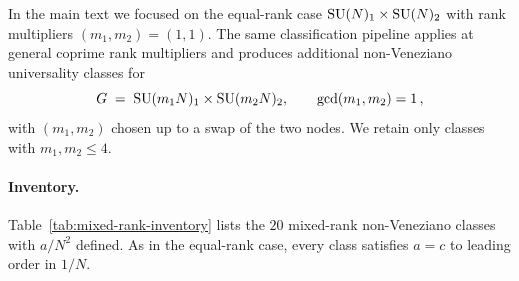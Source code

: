 
In the main text we focused on the equal-rank case
$\mathrm{SU}(N)_{1}\times\mathrm{SU}(N)_{2}$ with rank multipliers $(m_{1},m_{2})=(1,1)$.
The same classification pipeline applies at general coprime rank
multipliers and produces additional non-Veneziano universality classes
for
\begin{equation}
  G\;=\;\mathrm{SU}(m_{1}N)_{1}\times\mathrm{SU}(m_{2}N)_{2},
  \qquad\gcd(m_{1},m_{2})=1\,,
\end{equation}
with $(m_{1},m_{2})$ chosen up to a swap of the two nodes.  We retain
only classes with $m_{1},m_{2}\le 4$.

\paragraph{Inventory.}  Table~\ref{tab:mixed-rank-inventory} lists the
$20$ mixed-rank non-Veneziano classes with $a/N^{2}$ defined.  As in
the equal-rank case, every class satisfies $a=c$ to leading order in
$1/N$.

